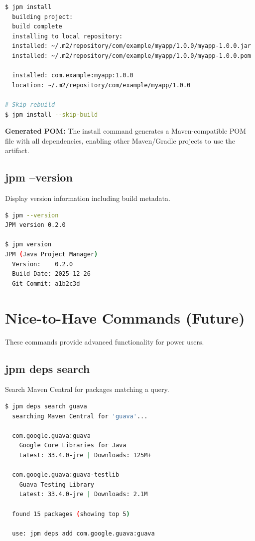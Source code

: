 \documentclass[12pt,a4paper]{report}
\begin{document}
\begin{lstlisting}[language=bash, caption=Local Installation]
$ jpm install
  building project:
  build complete
  installing to local repository:
  installed: ~/.m2/repository/com/example/myapp/1.0.0/myapp-1.0.0.jar
  installed: ~/.m2/repository/com/example/myapp/1.0.0/myapp-1.0.0.pom
  
  installed: com.example:myapp:1.0.0
  location: ~/.m2/repository/com/example/myapp/1.0.0

# Skip rebuild
$ jpm install --skip-build
\end{lstlisting}

\textbf{Generated POM:} The install command generates a Maven-compatible POM file with all dependencies, enabling other Maven/Gradle projects to use the artifact.

\subsection{jpm --version}

Display version information including build metadata.

\begin{lstlisting}[language=bash, caption=Version Information]
$ jpm --version
JPM version 0.2.0

$ jpm version
JPM (Java Project Manager)
  Version:    0.2.0
  Build Date: 2025-12-26
  Git Commit: a1b2c3d
\end{lstlisting}

\section{Nice-to-Have Commands (Future)}

These commands provide advanced functionality for power users.

\subsection{jpm deps search}

Search Maven Central for packages matching a query.

\begin{lstlisting}[language=bash, caption=Package Search]
$ jpm deps search guava
  searching Maven Central for 'guava'...
  
  com.google.guava:guava
    Google Core Libraries for Java
    Latest: 33.4.0-jre | Downloads: 125M+
  
  com.google.guava:guava-testlib
    Guava Testing Library
    Latest: 33.4.0-jre | Downloads: 2.1M
  
  found 15 packages (showing top 5)
  
  use: jpm deps add com.google.guava:guava
\end{lstlisting}
\end{document}
